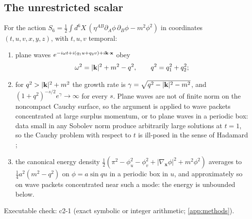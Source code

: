 \subsection{The unrestricted scalar}

\begin{proposition}
\label{prop:toy}
For the action $S_6=\tfrac12\int d^6X\,(\eta^{AB}\partial_A\phi\,\partial_B\phi-m^2\phi^2)$ in coordinates $(t,u,v,x,y,z)$, with $t,u,v$ temporal:
\begin{enumerate}[label=(\roman*),leftmargin=2.2em]
\item plane waves $e^{-i\omega t+i(q_1u+q_2v)+i\mathbf k\cdot\mathbf x}$ obey
\begin{equation}
\label{eq:toydisp}
\omega^2=|\mathbf k|^2+m^2-q^2,\qquad q^2=q_1^2+q_2^2 ;
\end{equation}
\item for $q^2>|\mathbf k|^2+m^2$ the growth rate is $\gamma=\sqrt{q^2-|\mathbf k|^2-m^2}$, and $(1+q^2)^{-s/2}e^\gamma\to\infty$ for every $s$. Plane waves are not of finite
norm on the noncompact Cauchy surface, so the argument is applied to wave packets concentrated at large surplus momentum, or to plane waves in a
periodic box: data small in any Sobolev norm produce arbitrarily large solutions at $t=1$, so the Cauchy problem with respect to $t$ is ill-posed in
the sense of Hadamard \cite{Hadamard23};
\item the canonical energy density $\tfrac12(\pi^2-\phi_u^2-\phi_v^2+|\nabla_{\mathbf x}\phi|^2+m^2\phi^2)$ averages to $\tfrac14a^2(m^2-q^2)$ on $\phi=a\sin qu$ in a
periodic box in $u$, and approximately so on wave packets concentrated near such a mode: the energy is unbounded below.
\end{enumerate}
\end{proposition}

\noindent Executable check: c2-1 (exact symbolic or integer arithmetic; \cref{app:methods}).

